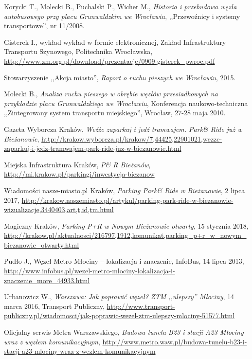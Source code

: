 \begin{thebibliography}{99}
	
	Korycki T., Molecki B., Puchalski P., Wicher M., \emph{Historia i przebudowa węzła autobusowego przy placu Grunwaldzkim we Wrocławiu}, ,,Przewoźnicy i systemy transportowe'', nr 11/2008.
	
	Gisterek I., wykład wykład w formie elektronicznej, Zakład Infrastruktury Transportu Szynowego, Politechnika Wrocławska, \url{http://www.zm.org.pl/download/prezentacje/0909-gisterek_pwroc.pdf}
	
	Stowarzyszenie ,,Akcja miasto'', \emph{Raport o ruchu pieszych we Wrocławiu}, 2015.
	
	Molecki B., \emph{Analiza ruchu pieszego w obrębie węzłów przesiadkowych na przykładzie placu Grunwaldzkiego we Wrocławiu}, Konferencja naukowo-techniczna ,,Zintegrowany system transportu miejskiego'', Wrocław, 27-28 maja 2010.
	
	
	Gazeta Wyborcza Kraków, \emph{Weźże zaparkuj i jedź tramwajem. Park\& Ride już w Bieżanowie}, \url{http://krakow.wyborcza.pl/krakow/7,44425,22901021,wezze-zaparkuj-i-jedz-tramwajem-park-ride-juz-w-biezanowie.html}
	
	Miejska Infrastruktura Kraków, \emph{P\& R Bieżanów}, \url{http://mi.krakow.pl/parkingi/inwestycja-biezanow}
	
	Wiadomości nasze-miasto.pl Kraków, \emph{Parking Park\& Ride w Bieżanowie}, 2 lipca 2017, \url{http://krakow.naszemiasto.pl/artykul/parking-park-ride-w-biezanowie-wizualizacje,3440403,art,t,id,tm.html}
	
	Magiczny Kraków, \emph{Parking P+R w Nowym Bieżanowie otwarty}, 15 stycznia 2018, \url{http://krakow.pl/aktualnosci/216797,1912,komunikat,parking_p+r_w_nowym_biezanowie_otwarty.html}
	
	
	Pudło J., {Węzeł Metro Młociny -- lokalizacja i znaczenie}, InfoBus, 14 lipca 2013, \url{http://www.infobus.pl/wezel-metro-mlociny-lokalizacja-i-znaczenie_more_44933.html}
	
	Urbanowicz W., \emph{Warszawa: Jak poprawić węzeł? ZTM ,,ulepszy'' Młociny}, 14 marca 2016, Transport Publiczny, \url{http://www.transport-publiczny.pl/wiadomosci/jak-poprawic-wezel-ztm-ulepszy-mlociny-51577.html}
	
	Oficjalny serwis Metra Warszawskiego, \emph{Budowa tunelu B23 i stacji A23 Młociny wraz z węzłem komunikacyjnym}, \url{http://www.metro.waw.pl/budowa-tunelu-b23-i-stacji-a23-mlociny-wraz-z-wezlem-komunikacyjnym}
	

\end{thebibliography}
